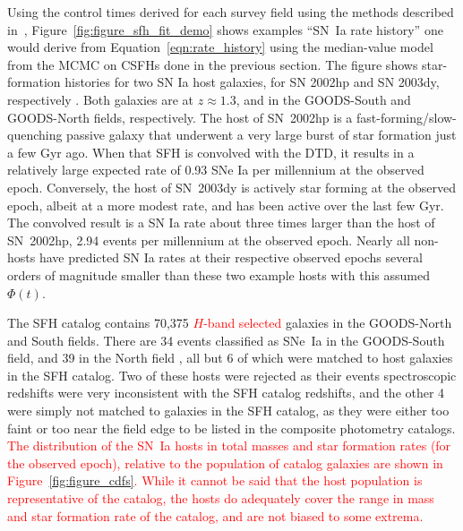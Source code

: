 \documentclass[apj, linenumbers]{aastex62}
\begin{document}
Using the control times derived for each survey field using the methods described in~\cite{Strolger:2015aa}, Figure~\ref{fig:figure_sfh_fit_demo} shows examples ``SN~Ia rate history'' one would derive from Equation~\ref{eqn:rate_history} using the median-value model from the MCMC on CSFHs done in the previous section. The figure shows star-formation histories for two SN Ia host galaxies, for SN 2002hp and SN 2003dy, respectively \cite[see][ for further details on these events]{Strolger:2004}. Both galaxies are at $z\approx 1.3$, and in the GOODS-South and GOODS-North fields, respectively. The host of SN~2002hp is a fast-forming/slow-quenching passive galaxy that underwent a very large burst of star formation just a few Gyr ago. When that SFH is convolved with the DTD, it results in a relatively large expected rate of 0.93 SNe Ia per millennium at the observed epoch.  Conversely, the host of SN~2003dy is actively star forming at the observed epoch, albeit at a more modest rate, and has been active over the last few Gyr. The convolved result is a SN Ia rate about three times larger than the host of SN~2002hp, 2.94 events per millennium at the observed epoch. Nearly all non-hosts have predicted SN Ia rates at their respective observed epochs several orders of magnitude smaller than these two example hosts with this assumed $\Phi(t)$.
  
  
The SFH catalog contains 70,375 \textcolor{red}{$H$-band selected} galaxies in the GOODS-North and South fields. There are 34 events classified as SNe~Ia in the GOODS-South field, and 39 in the North field \citep{Strolger:2004, Dahlen:2008, Rodney:2014fj}, all but 6 of which were matched to host galaxies in the SFH catalog. Two of these hosts were rejected as their events spectroscopic redshifts were very inconsistent with the SFH catalog redshifts, and the other 4 were simply not matched to galaxies in the SFH catalog, as they were either too faint or too near the field edge to be listed in the composite photometry catalogs. \textcolor{red}{The distribution of the SN~Ia hosts in total masses and star formation rates (for the observed epoch), relative to the population of catalog galaxies are shown in Figure~\ref{fig:figure_cdfs}. While it cannot be said that the host population is representative of the catalog, the hosts do adequately cover the range in mass and star formation rate of the catalog, and are not biased to some extrema.}


%
\end{document}
